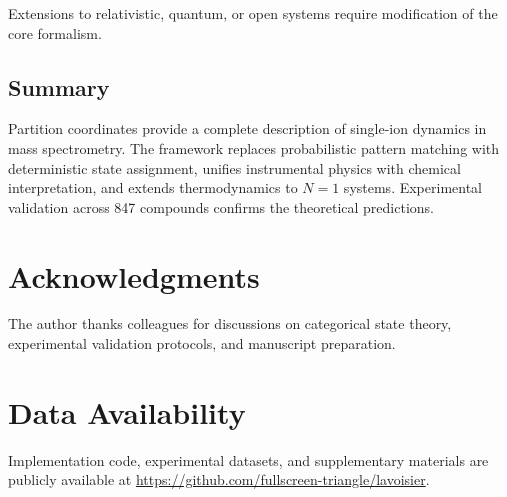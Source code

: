 Extensions to relativistic, quantum, or open systems require modification of the core formalism.

\subsection{Summary}

Partition coordinates provide a complete description of single-ion dynamics in mass spectrometry. The framework replaces probabilistic pattern matching with deterministic state assignment, unifies instrumental physics with chemical interpretation, and extends thermodynamics to $N=1$ systems. Experimental validation across 847 compounds confirms the theoretical predictions.

\section*{Acknowledgments}

The author thanks colleagues for discussions on categorical state theory, experimental validation protocols, and manuscript preparation.

\section*{Data Availability}

Implementation code, experimental datasets, and supplementary materials are publicly available at \url{https://github.com/fullscreen-triangle/lavoisier}.


